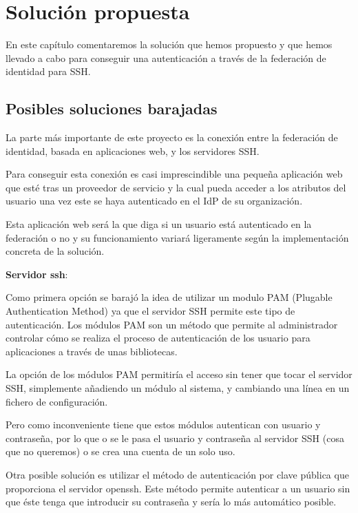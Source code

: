 \chapter{Solución propuesta}

    En este capítulo comentaremos la solución que hemos propuesto y que
    hemos llevado a cabo para conseguir una autenticación a través de la
    federación de identidad para SSH.

    \section{Posibles soluciones barajadas}

    La parte más importante de este proyecto es la conexión entre la
    federación de identidad, basada en aplicaciones web, y los servidores
    SSH.

    Para conseguir esta conexión es casi imprescindible una pequeña
    aplicación web que esté tras un proveedor de servicio y la cual pueda
    acceder a los atributos del usuario una vez este se haya autenticado
    en el IdP de su organización.

    Esta aplicación web será la que diga si un usuario está
    autenticado en la federación o no y su funcionamiento variará
    ligeramente según la implementación concreta de la solución.

    \textbf{Servidor ssh}:

    Como primera opción se barajó la idea de utilizar un modulo PAM
    (Plugable Authentication Method) ya que el servidor SSH permite este
    tipo de autenticación. Los módulos PAM son un método que permite al
    administrador controlar cómo se realiza el proceso de autenticación de
    los usuario para aplicaciones a través de unas bibliotecas.

    La opción de los módulos PAM permitiría el acceso sin tener que tocar
    el servidor SSH, simplemente añadiendo un módulo al sistema, y
    cambiando una línea en un fichero de configuración.

    Pero como inconveniente tiene que estos módulos autentican con usuario
    y contraseña, por lo que o se le pasa el usuario y contraseña al
    servidor SSH (cosa que no queremos) o se crea una cuenta de un solo
    uso.

    Otra posible solución es utilizar el método de autenticación por clave
    pública que proporciona el servidor openssh. Este método permite
    autenticar a un usuario sin que éste tenga que introducir su
    contraseña y sería lo más automático posible.

